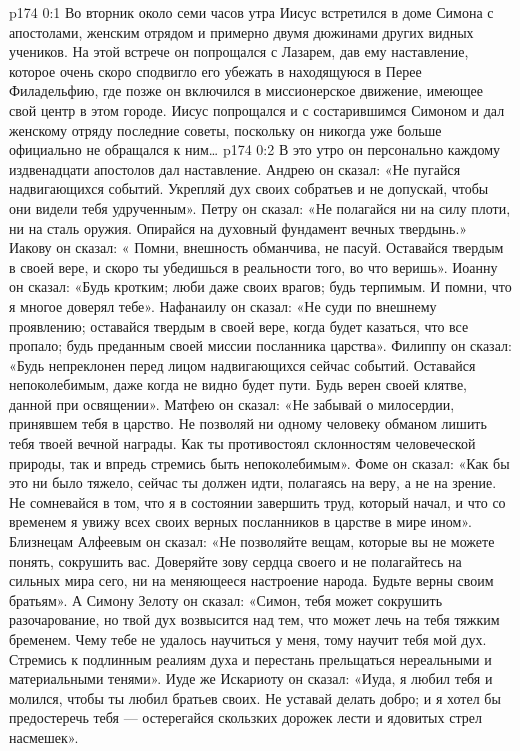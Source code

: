\author{Комиссия срединников}
\vs p174 0:1 Во вторник около семи часов утра Иисус встретился в доме Симона с апостолами, женским отрядом и примерно двумя дюжинами других видных учеников. На этой встрече он попрощался с Лазарем, дав ему наставление, которое очень скоро сподвигло его убежать в находящуюся в Перее Филадельфию, где позже он включился в миссионерское движение, имеющее свой центр в этом городе. Иисус попрощался и с состарившимся Симоном и дал женскому отряду последние советы, поскольку он никогда уже больше официально не обращался к ним\ldots
\vs p174 0:2 В это утро он персонально каждому издвенадцати апостолов дал наставление. Андрею он сказал: «Не пугайся надвигающихся событий. Укрепляй дух своих собратьев и не допускай, чтобы они видели тебя удрученным». Петру он сказал: «Не полагайся ни на силу плоти, ни на сталь оружия. Опирайся на духовный фундамент вечных твердынь.» Иакову он сказал: « Помни, внешность обманчива, не пасуй. Оставайся твердым в своей вере, и скоро ты убедишься в реальности того, во что веришь». Иоанну он сказал: «Будь кротким; люби даже своих врагов; будь терпимым. И помни, что я многое доверял тебе». Нафанаилу он сказал: «Не суди по внешнему проявлению; оставайся твердым в своей вере, когда будет казаться, что все пропало; будь преданным своей миссии посланника царства». Филиппу он сказал: «Будь непреклонен перед лицом надвигающихся сейчас событий. Оставайся непоколебимым, даже когда не видно будет пути. Будь верен своей клятве, данной при освящении». Матфею он сказал: «Не забывай о милосердии, принявшем тебя в царство. Не позволяй ни одному человеку обманом лишить тебя твоей вечной награды. Как ты противостоял склонностям человеческой природы, так и впредь стремись быть непоколебимым». Фоме он сказал: «Как бы это ни было тяжело, сейчас ты должен идти, полагаясь на веру, а не на зрение. Не сомневайся в том, что я в состоянии завершить труд, который начал, и что со временем я увижу всех своих верных посланников в царстве в мире ином». Близнецам Алфеевым он сказал: «Не позволяйте вещам, которые вы не можете понять, сокрушить вас. Доверяйте зову сердца своего и не полагайтесь на сильных мира сего, ни на меняющееся настроение народа. Будьте верны своим братьям». А Симону Зелоту он сказал: «Симон, тебя может сокрушить разочарование, но твой дух возвысится над тем, что может лечь на тебя тяжким бременем. Чему тебе не удалось научиться у меня, тому научит тебя мой дух. Стремись к подлинным реалиям духа и перестань прельщаться нереальными и материальными тенями». Иуде же Искариоту он сказал: «Иуда, я любил тебя и молился, чтобы ты любил братьев своих. Не уставай делать добро; и я хотел бы предостеречь тебя --- остерегайся скользких дорожек лести и ядовитых стрел насмешек».
